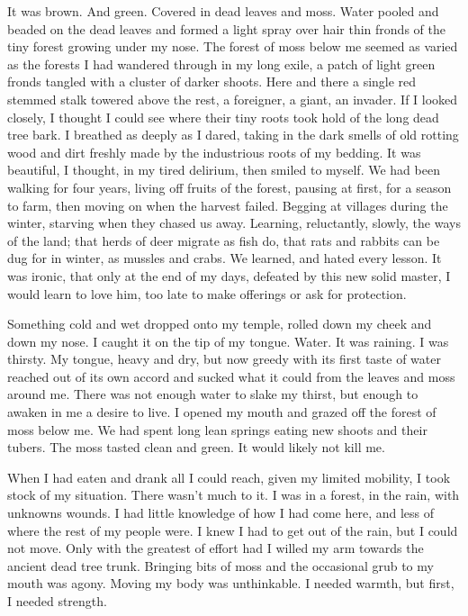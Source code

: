 It was brown. And green. Covered in dead leaves and moss. Water pooled and beaded on the dead leaves and formed a light spray over hair thin fronds of the tiny forest growing under my nose. The forest of moss below me seemed as varied as the forests I had wandered through in my long exile, a patch of light green fronds tangled with a cluster of darker shoots. Here and there a single red stemmed stalk towered above the rest, a foreigner, a giant, an invader. If I looked closely, I thought I could see where their tiny roots took hold of the long dead tree bark. I breathed as deeply as I dared, taking in the dark smells of old rotting wood and dirt freshly made by the industrious roots of my bedding. It was beautiful, I thought, in my tired delirium, then smiled to myself. We had been walking for four years, living off fruits of the forest, pausing at first, for a season to farm, then moving on when the harvest failed. Begging at villages during the winter, starving when they chased us away. Learning, reluctantly, slowly, the ways of the land; that herds of deer migrate as fish do, that rats and rabbits can be dug for in winter, as mussles and crabs. We learned, and hated every lesson. It was ironic, that only at the end of my days, defeated by this new solid master, I would learn to love him, too late to make offerings or ask for protection.

Something cold and wet dropped onto my temple, rolled down my cheek and down my nose. I caught it on the tip of my tongue. Water. It was raining. I was thirsty. My tongue, heavy and dry, but now greedy with its first taste of water reached out of its own accord and sucked what it could from the leaves and moss around me. There was not enough water to slake my thirst, but enough to awaken in me a desire to live. I opened my mouth and grazed off the forest of moss below me. We had spent long lean springs eating new shoots and their tubers. The moss tasted clean and green. It would likely not kill me.

When I had eaten and drank all I could reach, given my limited mobility, I took stock of my situation. There wasn't much to it. I was in a forest, in the rain, with unknowns wounds. I had little knowledge of how I had come here, and less of where the rest of my people were. I knew I had to get out of the rain, but I could not move. Only with the greatest of effort had I willed my arm towards the ancient dead tree trunk. Bringing bits of moss and the occasional grub to my mouth was agony. Moving my body was unthinkable. I needed warmth, but first, I needed strength.

